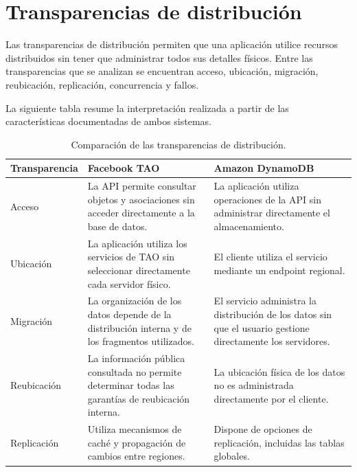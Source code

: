 \documentclass[12pt,a4paper]{article}
\begin{document}
\section{Transparencias de distribución}

Las transparencias de distribución permiten que una aplicación utilice recursos distribuidos sin tener que administrar todos sus detalles físicos. Entre las transparencias que se analizan se encuentran acceso, ubicación, migración, reubicación, replicación, concurrencia y fallos.

La siguiente tabla resume la interpretación realizada a partir de las características documentadas de ambos sistemas.

\begin{table}[H]
\centering
\small
\caption{Comparación de las transparencias de distribución.}
\label{tab:transparencias}
\begin{tabular}{p{2.4cm}p{5.6cm}p{5.6cm}}
\toprule
\textbf{Transparencia} &
\textbf{Facebook TAO} &
\textbf{Amazon DynamoDB} \\
\midrule

Acceso &
La API permite consultar objetos y asociaciones sin acceder directamente a la base de datos. &
La aplicación utiliza operaciones de la API sin administrar directamente el almacenamiento. \\

\midrule

Ubicación &
La aplicación utiliza los servicios de TAO sin seleccionar directamente cada servidor físico. &
El cliente utiliza el servicio mediante un endpoint regional. \\

\midrule

Migración &
La organización de los datos depende de la distribución interna y de los fragmentos utilizados. &
El servicio administra la distribución de los datos sin que el usuario gestione directamente los servidores. \\

\midrule

Reubicación &
La información pública consultada no permite determinar todas las garantías de reubicación interna. &
La ubicación física de los datos no es administrada directamente por el cliente. \\

\midrule

Replicación &
Utiliza mecanismos de caché y propagación de cambios entre regiones. &
Dispone de opciones de replicación, incluidas las tablas globales. \\


\end{tabular}
\end{table}
\end{document}
